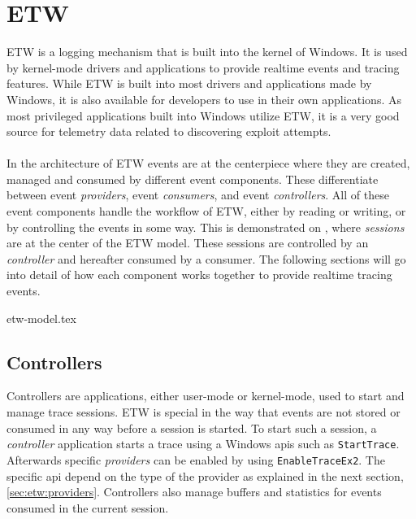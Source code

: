 \documentclass{report}
\begin{document}
\section{\acrfull{ETW}}
\label{cha:etw}
\gls{ETW} is a logging mechanism that is built into the kernel of Windows. It is used by kernel-mode drivers and applications to provide realtime events and tracing features. While \gls{ETW} is built into most drivers and applications made by Windows, it is also available for developers to use in their own applications. As most privileged applications built into Windows utilize \gls{ETW}, it is a very good source for telemetry data related to discovering exploit attempts.
\\
\\
In the architecture of \gls{ETW} events are at the centerpiece where they are created, managed and consumed by different event components\cite{url:etw:about}. These differentiate between event \emph{providers}, event \emph{consumers}, and event \emph{controllers}. All of these event components handle the workflow of \gls{ETW}, either by reading or writing, or by controlling the events in some way. This is demonstrated on , where \emph{sessions} are at the center of the \gls{ETW} model. These sessions are controlled by an \emph{controller} and hereafter consumed by a consumer. The following sections will go into detail of how each component works together to provide realtime tracing events.

{etw-model.tex}

\subsection{Controllers}
Controllers are applications, either user-mode or kernel-mode, used to start and manage trace sessions. \gls{ETW} is special in the way that events are not stored or consumed in any way before a session is started. To start such a session, a \emph{controller} application starts a trace using a Windows \gls{api}s such as \texttt{StartTrace}. Afterwards specific \emph{providers} can be enabled by using \texttt{EnableTraceEx2}. The specific \gls{api} depend on the type of the provider as explained in the next section, \ref{sec:etw:providers}. Controllers also manage buffers and statistics for events consumed in the current session.
\end{document}
